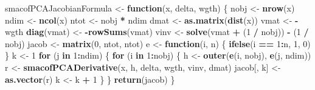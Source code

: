 \documentclass[
  12pt,
]{article}
\newenvironment{Shaded}{\begin{snugshade}}{\end{snugshade}}
\newcommand{\ControlFlowTok}[1]{\textcolor[rgb]{0.13,0.29,0.53}{\textbf{#1}}}
\newcommand{\DecValTok}[1]{\textcolor[rgb]{0.00,0.00,0.81}{#1}}
\newcommand{\FunctionTok}[1]{\textcolor[rgb]{0.13,0.29,0.53}{\textbf{#1}}}
\newcommand{\NormalTok}[1]{#1}
\newcommand{\OtherTok}[1]{\textcolor[rgb]{0.56,0.35,0.01}{#1}}
\newcommand{\SpecialCharTok}[1]{\textcolor[rgb]{0.81,0.36,0.00}{\textbf{#1}}}
\begin{document}
\begin{Shaded}
\begin{Highlighting}[]
\NormalTok{smacofPCAJacobianFormula }\OtherTok{\textless{}{-}} \ControlFlowTok{function}\NormalTok{(x, delta, wgth) \{}
\NormalTok{  nobj }\OtherTok{\textless{}{-}} \FunctionTok{nrow}\NormalTok{(x)}
\NormalTok{  ndim }\OtherTok{\textless{}{-}} \FunctionTok{ncol}\NormalTok{(x)}
\NormalTok{  ntot }\OtherTok{\textless{}{-}}\NormalTok{ nobj }\SpecialCharTok{*}\NormalTok{ ndim}
\NormalTok{  dmat }\OtherTok{\textless{}{-}} \FunctionTok{as.matrix}\NormalTok{(}\FunctionTok{dist}\NormalTok{(x))}
\NormalTok{  vmat }\OtherTok{\textless{}{-}} \SpecialCharTok{{-}}\NormalTok{wgth}
  \FunctionTok{diag}\NormalTok{(vmat) }\OtherTok{\textless{}{-}} \SpecialCharTok{{-}}\FunctionTok{rowSums}\NormalTok{(vmat)}
\NormalTok{  vinv }\OtherTok{\textless{}{-}} \FunctionTok{solve}\NormalTok{(vmat }\SpecialCharTok{+}\NormalTok{ (}\DecValTok{1} \SpecialCharTok{/}\NormalTok{ nobj)) }\SpecialCharTok{{-}}\NormalTok{ (}\DecValTok{1} \SpecialCharTok{/}\NormalTok{ nobj)}
\NormalTok{  jacob }\OtherTok{\textless{}{-}} \FunctionTok{matrix}\NormalTok{(}\DecValTok{0}\NormalTok{, ntot, ntot)}
\NormalTok{  e }\OtherTok{\textless{}{-}} \ControlFlowTok{function}\NormalTok{(i, n) \{}
    \FunctionTok{ifelse}\NormalTok{(i }\SpecialCharTok{==} \DecValTok{1}\SpecialCharTok{:}\NormalTok{n, }\DecValTok{1}\NormalTok{, }\DecValTok{0}\NormalTok{)}
\NormalTok{  \}}
\NormalTok{  k }\OtherTok{\textless{}{-}} \DecValTok{1}
  \ControlFlowTok{for}\NormalTok{ (j }\ControlFlowTok{in} \DecValTok{1}\SpecialCharTok{:}\NormalTok{ndim) \{}
    \ControlFlowTok{for}\NormalTok{ (i }\ControlFlowTok{in} \DecValTok{1}\SpecialCharTok{:}\NormalTok{nobj) \{}
\NormalTok{      h }\OtherTok{\textless{}{-}} \FunctionTok{outer}\NormalTok{(}\FunctionTok{e}\NormalTok{(i, nobj), }\FunctionTok{e}\NormalTok{(j, ndim))}
\NormalTok{      r }\OtherTok{\textless{}{-}} \FunctionTok{smacofPCADerivative}\NormalTok{(x, h, delta, wgth, vinv, dmat)}
\NormalTok{      jacob[, k] }\OtherTok{\textless{}{-}} \FunctionTok{as.vector}\NormalTok{(r)}
\NormalTok{      k }\OtherTok{\textless{}{-}}\NormalTok{ k }\SpecialCharTok{+} \DecValTok{1}
\NormalTok{    \}}
\NormalTok{  \}}
  \FunctionTok{return}\NormalTok{(jacob)}
\NormalTok{\}}


\end{Highlighting}
\end{Shaded}
\end{document}
